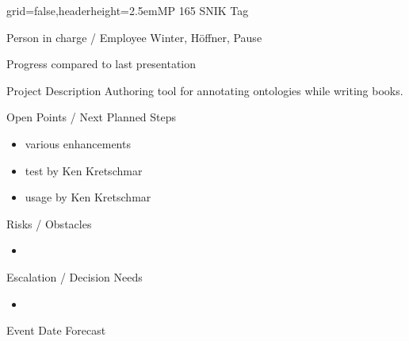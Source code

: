 \documentclass[english]{kiesgrube}
\begin{document}

\newpage

\begin{poster}{grid=false,headerheight=2.5em}{}{MP 165 SNIK Tag}{}{}
\begin{posterbox}[name=person,column=0,row=0]{Person in charge / Employee}
Winter, Höffner, Pause
\end{posterbox}
\begin{posterbox}[name=progress,below=person]{Progress compared to last presentation}
\end{posterbox}
\begin{posterbox}[name=description,column=1,row=0]{Project Description}
\small
Authoring tool for annotating ontologies while writing books.
\end{posterbox}
\begin{posterbox}[name=open,column=1,below=description]{Open Points / Next Planned Steps}
\begin{itemize}
\item various enhancements
\item test by Ken Kretschmar
\item usage by Ken Kretschmar
\end{itemize}
\end{posterbox}
\begin{posterbox}[name=risks,column=1,below=open]{Risks / Obstacles}
\begin{itemize}
\item  
\end{itemize}
\end{posterbox}
\begin{posterbox}[name=escalation,column=1,below=risks]{Escalation / Decision Needs}
\begin{itemize}
\item 
\end{itemize}
\end{posterbox}
\begin{posterbox}[name=event,column=0,below=progress]{Event Date Forecast}
\begin{tabulary}{\textwidth}{lL}
\end{tabulary}
\end{posterbox}
\footer{}
\end{poster}
\end{document}
